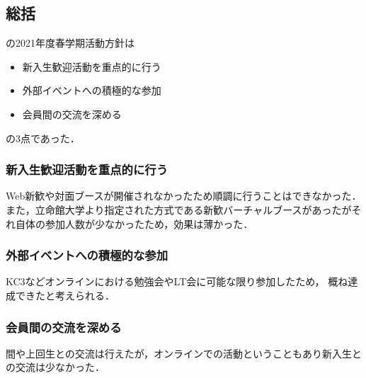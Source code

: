 \subsection*{\secondGrade{}総括}


\secondGrade{}の2021年度春学期活動方針は
\begin{itemize}
    \item 新入生歓迎活動を重点的に行う
    \item 外部イベントへの積極的な参加
    \item 会員間の交流を深める
\end{itemize}
の3点であった．

\subsubsection*{ 新入生歓迎活動を重点的に行う}
Web新歓や対面ブースが開催されなかったため順調に行うことはできなかった．
また，立命館大学より指定された方式である新歓バーチャルブースがあったがそれ自体の参加人数が少なかったため，効果は薄かった．

\subsubsection*{外部イベントへの積極的な参加}
KC3などオンラインにおける勉強会やLT会に可能な限り参加したため，
概ね達成できたと考えられる．

\subsubsection*{会員間の交流を深める}
\secondGrade{}間や上回生との交流は行えたが，オンラインでの活動ということもあり新入生との交流は少なかった．

